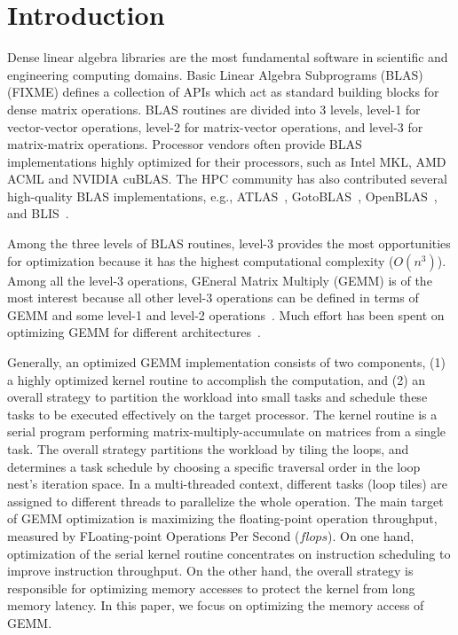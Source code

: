 \section{Introduction}\label{sec:intro}
Dense linear algebra libraries are the most fundamental software in
scientific and engineering computing domains.
Basic Linear Algebra Subprograms (BLAS) (FIXME) defines a collection
of APIs which act as standard building blocks for dense matrix operations.
BLAS routines are divided into 3 levels,
level-1 for vector-vector operations,
level-2 for matrix-vector operations,
and level-3 for matrix-matrix operations.
Processor vendors often provide BLAS implementations
highly optimized for their processors,
such as Intel MKL, AMD ACML and NVIDIA cuBLAS.
The HPC community has also contributed several high-quality
BLAS implementations, e.g., ATLAS~\cite{atlas},
GotoBLAS~\cite{gotoblas}, OpenBLAS~\cite{openblas},
and BLIS~\cite{blis,blisport}.

Among the three levels of BLAS routines, level-3 provides the most opportunities
for optimization because it has the highest computational complexity ($O(n^3)$).
Among all the level-3 operations, GEneral Matrix Multiply (GEMM) is
of the most interest because all other level-3 operations can be defined
in terms of GEMM and some level-1 and level-2 operations~\cite{gemmbased1}.
Much effort has been spent on optimizing GEMM for different
architectures~\cite{Liu2012,Wang2015,Volkov:2008,Cui11,blispar}.

Generally, an optimized GEMM implementation consists of two components,
(1) a highly optimized kernel routine to accomplish the computation, and
(2) an overall strategy to partition the workload into small tasks
and schedule these tasks to be executed effectively on the target processor.
The kernel routine is a serial program performing matrix-multiply-accumulate
on matrices from a single task.
The overall strategy partitions the workload by tiling the loops,
and determines a task schedule by choosing a specific traversal order
in the loop nest's iteration space.
In a multi-threaded context, different tasks (loop tiles) are assigned to
different threads to parallelize the whole operation.
The main target of GEMM optimization is maximizing the floating-point
operation throughput, measured by FLoating-point Operations Per Second ($flops$).
On one hand, optimization of the serial kernel routine concentrates on
instruction scheduling to improve instruction throughput.
On the other hand, the overall strategy is responsible for optimizing
memory accesses to protect the kernel from long memory latency.
In this paper, we focus on optimizing the memory access of GEMM.

